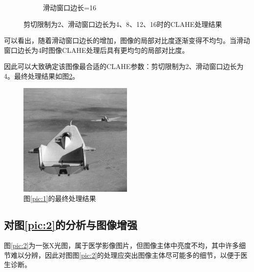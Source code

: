 \documentclass[a4paper]{ctexart}
\newcommand{\outwfour}{0.23\textwidth}
\begin{document}
\begin{spacing}{1.35}
\begin{figure}[htbp]
\begin{subfigure}[t]{\outwfour}
			\caption{滑动窗口边长=16}
		\end{subfigure}
		\caption{剪切限制为2、滑动窗口边长为4、8、12、16时的CLAHE处理结果}
		\label{fig:CLAHE3}
	\end{figure}
	可以看出，随着滑动窗口边长的增加，图像的局部对比度逐渐变得不均匀。当滑动窗口边长为4时图像CLAHE处理后具有更均匀的局部对比度。

	因此可以大致确定该图像最合适的CLAHE参数：剪切限制为2、滑动窗口边长为4。最终处理结果如图\ref{fig:CLAHE4}。
	\begin{figure}[htbp]
		\centering
		\includegraphics[width=0.5\textwidth]{figure/1_tile_grid_size_4.png}
		\caption{图\ref{pic:1}的最终处理结果}
		\label{fig:CLAHE4}
	\end{figure}

	\subsection{对图\ref{pic:2}的分析与图像增强}
	图\ref{pic:2}为一张X光图，属于医学影像图片，但图像主体中亮度不均，其中许多细节难以分辨，因此对图图\ref{pic:2}的处理应突出图像主体尽可能多的细节，以便于医生诊断。


\end{spacing}
\end{document}
